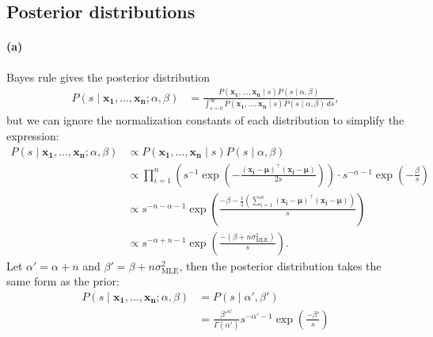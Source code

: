 \documentclass[a4paper,11pt]{article}
\DeclareMathOperator{\given}{\mid}
\begin{document}
\subsection{Posterior distributions}

\paragraph{(a)} Bayes rule gives the posterior distribution
\begin{align*}
  P(s\given \mathbf{x_1},\dots,\mathbf{x_n};\alpha,\beta)
    &=\frac{
        P(\mathbf{x_1},\dots,\mathbf{x_n}\given s)P(s\given\alpha,\beta)
      }{
        \int_{s=0}^\infty P(\mathbf{x_1},\dots,\mathbf{x_n}\given s)P(s\given\alpha,\beta)\,ds
      },
\end{align*}
but we can ignore the normalization constants of each distribution to simplify the expression:
\begin{align*}
  P(s\given \mathbf{x_1},\dots,\mathbf{x_n};\alpha,\beta)
    &\propto P(\mathbf{x_1},\dots,\mathbf{x_n}\given s)P(s\given\alpha,\beta)\\
    &\propto
      \prod_{i=1}^n \left(
        s^{-1}\exp\left(-\frac{(\mathbf{x_i}-\boldsymbol\mu)^\top(\mathbf{x_i}-\boldsymbol\mu)}{2s}\right)
      \right)
      \cdot
      s^{-\alpha-1}\exp\left(-\frac{\beta}{s}\right)\\
    &\propto
      s^{-n-\alpha-1}
      \exp\left(
        \frac{
          -\beta
          -\frac{1}{2}\left(
            \sum_{i=1}^n
              (\mathbf{x_i}-\boldsymbol\mu)^\top(\mathbf{x_i}-\boldsymbol\mu)
          \right)
        }{
          s
        }
      \right)\\
    &\propto
      s^{-{\alpha+n}-1}
      \exp\left(
        \frac{
          -(\beta+n\sigma_\mathrm{MLE}^2)
        }{
          s
        }
      \right).
\end{align*}
Let $\alpha'=\alpha+n$ and $\beta'=\beta+n\sigma_\mathrm{MLE}^2$, then the posterior distribution takes the same form as the prior:
\begin{align*}
P(s\given \mathbf{x_1},\dots,\mathbf{x_n};\alpha,\beta)
  &=P(s\given\alpha',\beta')\\
  &=\frac{{\beta'}^{\alpha'}}{\Gamma(\alpha')}s^{-\alpha'-1}\exp\left(\frac{-\beta'}{s}\right)
\end{align*}
\end{document}
